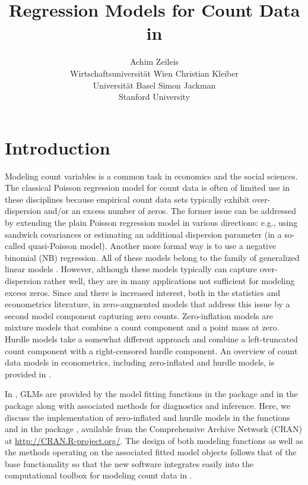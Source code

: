 \documentclass{Z}
\author{Achim Zeileis\\Wirtschaftsuniversit\"at Wien \And
        Christian Kleiber\\Universit\"at Basel \And
	Simon Jackman\\Stanford University}
\title{Regression Models for Count Data in \proglang{R}}
\newcommand{\fct}[1]{\code{#1()}}
\begin{document}


\section{Introduction} \label{sec:intro}

Modeling count variables is a common task in economics and the social
sciences. The classical Poisson regression model for count
data is often of limited use in these disciplines because empirical
count data sets typically exhibit over-dispersion and/or an excess
number of zeros. The former issue can be addressed by extending 
the plain Poisson regression model in various directions: e.g.,
using sandwich covariances or estimating an additional dispersion
parameter (in a so-called quasi-Poisson model). Another more formal
way is to use a negative binomial (NB) regression. All of these models
belong to the family of generalized linear models 
\citep[GLMs, see][]{countreg:Nelder+Wedderburn:1972,countreg:McCullagh+Nelder:1989}.
However, although these models typically can capture over-dispersion
rather well, they are in many applications not sufficient for 
modeling excess zeros. Since \cite{countreg:Mullahy:1986} and
\cite{countreg:Lambert:1992} there is increased interest, both in the
statistics and econometrics literature, in zero-augmented models
that address this issue by a second model component capturing zero counts.
Zero-inflation models \citep{countreg:Lambert:1992}
are mixture models that combine a count component and a point mass at zero.
Hurdle models \citep{countreg:Mullahy:1986} take a somewhat different
approach and combine a left-truncated count component with a
right-censored hurdle component.
An overview of count data models in econometrics, including 
zero-inflated and hurdle models, is provided in
\cite{countreg:Cameron+Trivedi:1998,countreg:Cameron+Trivedi:2005}.

In  \citep{countreg:R:2007}, GLMs are provided
by the model fitting functions \fct{glm} \citep{countreg:Chambers+Hastie:1992}
in the  package and \fct{glm.nb} in the 
package \citep{countreg:Venables+Ripley:2002} along with associated
methods for diagnostics and inference. Here, we discuss the implementation
of zero-inflated and hurdle models in the functions \fct{zeroinfl}
and \fct{hurdle} in the  package \citep{countreg:Jackman:2007},
available from the Comprehensive  Archive Network (CRAN)
at \url{http://CRAN.R-project.org/}.
The design of both modeling functions as well as the methods operating
on the associated fitted model objects follows that of the base 
functionality so that the new software integrates easily into the
computational toolbox for modeling count data in .
\end{document}
